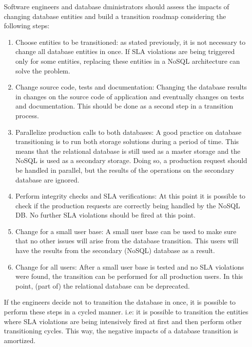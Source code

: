 Software engineers and database dministrators should assess the impacts of changing database entities and build a transition roadmap considering the following steps:

\begin{enumerate}
\item{Choose entities to be transitioned: as stated previously, it is not necessary to change all database entities in once. If SLA violations are being triggered only for some entities, replacing these entities in a NoSQL architecture can solve the problem.}
\item{Change source code, tests and documentation: Changing the database results in changes on the source code of application and eventually changes on tests and documentation. This should be done as a second step in a transition process. }
\item{Parallelize production calls to both databases: A good practice on database transitioning is to run both storage solutions during a period of time. This means that the relational database is still used as a master storage and the NoSQL is used as a secondary storage. Doing so, a production request should be handled in parallel, but the results of the operations on the secondary database are ignored.}
\item{Perform integrity checks and SLA verifications: At this point it is possible to check if the production requests are correctly being handled by the NoSQL DB. No further SLA violations should be fired at this point.}
\item{Change for a small user base: A small user base can be used to make sure that no other issues will arise from the database transition. This users will have the results from the secondary (NoSQL) database as a result.  }
\item{Change for all users: After a small user base is tested and no SLA violations were found, the transition can be performed for all production users. In this point, (part of) the relational database can be deprecated.}

\end{enumerate}

If the engineers decide not to transition the database in once, it is possible to perform these steps in a cycled manner. i.e: it is possible to transition the entities where SLA violations are being intensively fired at first and then perform other transitioning cycles. This way, the negative impacts of a database transition is amortized. 

